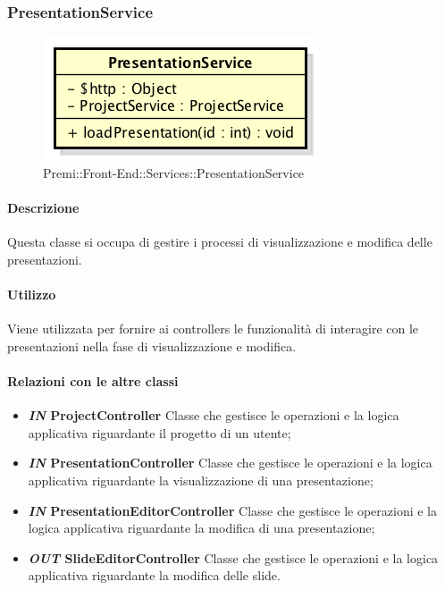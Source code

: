 	
\subsubsection{PresentationService}
	\begin{figure}[h]
		\centering
		\includegraphics[width=0.4\linewidth]{img/premi_front_end_services_presentationservice}
		\caption[Premi::Front-End::Services::PresentationService]{Premi::Front-End::Services::PresentationService}
	\end{figure}
	
	\paragraph{Descrizione}
	Questa classe si occupa di gestire i processi di visualizzazione e modifica delle presentazioni.
	
	\paragraph{Utilizzo}
	Viene utilizzata per fornire ai controllers le funzionalità di interagire con le presentazioni nella fase di visualizzazione e modifica.
	
	\paragraph{Relazioni con le altre classi}
	\begin{itemize}
		\item \textbf{\textit{IN} ProjectController}
		Classe che gestisce le operazioni e la logica applicativa riguardante il progetto di un utente;
		\item \textbf{\textit{IN} PresentationController}
		Classe che gestisce le operazioni e la logica applicativa riguardante la visualizzazione di una presentazione;
		\item \textbf{\textit{IN} PresentationEditorController}
		Classe che gestisce le operazioni e la logica applicativa riguardante la modifica di una presentazione;
		\item \textbf{\textit{OUT} SlideEditorController}
		Classe che gestisce le operazioni e la logica applicativa riguardante la modifica delle slide.
	\end{itemize}
	
